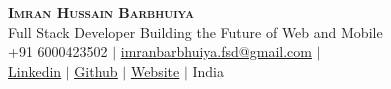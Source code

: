 \documentclass[A4,11pt]{article}
\begin{document}
\begin{comment}
In Europe it is common to include a picture of ones self in the CV. Select
which heading appropriate for the document you are creating.
\end{comment}


\begin{center}
   \textbf{\Huge \scshape Imran Hussain Barbhuiya} \\ \vspace{1pt} %
   \small Full Stack Developer Building the Future of Web and Mobile \\
   \small +91 6000423502 $|$ 
   \href{mailto:imranbarbhuiya.fsd@gmail.com}{\underline{imranbarbhuiya.fsd@gmail.com}} $|$\\
   \href{https://linkedin.com/in/imranbarbhuiya}{\underline{\color{blue} Linkedin}} $|$
   \href{https://github.com/imranbarbhuiya}{\underline{\color{blue} Github}} $|$
   \href{https://parbez.me/resume}{\underline{\color{blue} Website}} $|$
   \small India
\end{center}



\begin{comment}
This CV was written for specifically for positions I was applying for in
academia, and then modified to be a template.

A standard CV is about two pages long where as a resume in the US is one page.
sections can be added and removed here with this in mind. In my experience, 
education, and applicable work experience and skills are the most import things
to include on a resume. For a CV the Europass CV suggests the categories: Work
Experience, Education and Training, Language Skills, Digital Skills,
Communication and Interpersonal Skills, Conferences and Seminars, Creative Works
Driver's License, Hobbies and Interests, Honors and Awards, Management and
Leadership Skills, Networks and Memberships, Organizational Skills, Projects,
Publications, Recommendations, Social and Political Activities, Volunteering.

Your goal is to convey a who, what , when, where, why for every item you share. 
The who is obviously you, but I believe the rest should be done in that order.
For example below. An employer cares most about the degree held and typically 
less about the institution or where it is located (This is still good 
information though). Whatever order you choose be consistent throughout.
\end{comment}
\end{document}
